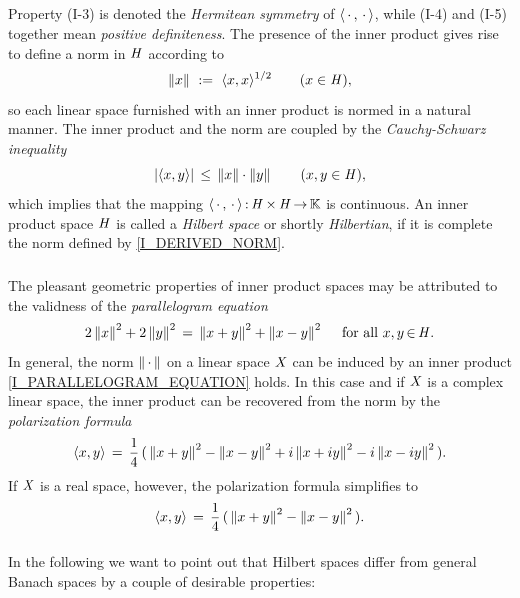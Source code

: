 \documentclass[11pt,twoside]{article}
\begin{document}
\subparagraph{}
Property (I-3) is denoted the \textit{Hermitean symmetry}
of $\langle \,\cdot\,,\,\cdot\, \rangle$,
while (I-4) and (I-5) together mean \textit{positive definiteness}.
The presence of the inner product gives rise to define a norm in $\mathit{H}$
according to
\begin{equation}\label{I_DERIVED_NORM}
\left\lVert x \right\rVert \, \,:=\, \, \langle x,x \rangle ^{1/2} \quad \quad (x \in \mathit{H}),
\end{equation}
so each linear space furnished with an inner product is normed
in a natural manner.
The inner product and the norm are coupled by
the \textit{Cauchy-Schwarz} \textit{inequality}
\[
\abs{\scalar{x}{y}} \, \leq \,
\norm{x} \cdot \norm{y} \quad \quad (x,y \in \hilH),
\]
which implies that the mapping
$\langle \,\cdot\,,\,\cdot\, \rangle{\,:\,}\mathit{H} {\,\times\,} \mathit{H} {\,\to\,} {\mathbb{K}}$ is continuous.
An inner product space $\mathit{H}$ is called a \textit{Hilbert space}
or shortly \textit{Hilbertian},
if it is complete {\wrt} the norm defined by \eqref{I_DERIVED_NORM}.

\subparagraph{} %
The pleasant geometric properties of inner product spaces
may be attributed to the validness of the \textit{parallelogram equation}
\begin{equation}\label{I_PARALLELOGRAM_EQUATION}
2 \left\lVert x \right\rVert^2 + 2 \left\lVert y \right\rVert^2 \,=\, \left\lVert x+y \right\rVert^2 + \left\lVert x-y \right\rVert^2
\quad \mbox{ for all } x,y {\,\in\,} \mathit{H}.
\end{equation}
In general,
the norm $\left\lVert \,\cdot\, \right\rVert$ on a linear space $\mathit{X}$
can be induced by an inner product
\iff \eqref{I_PARALLELOGRAM_EQUATION} holds.
In this case and if $\mathit{X}$ is a complex linear space,
the inner product can be recovered from the norm
by the \textit{polarization formula}
\[
\langle x,y \rangle
\,=\,
\frac{1}{4} \,
(\,
\left\lVert x + y \right\rVert^2 - \left\lVert x-y \right\rVert^2 +i \left\lVert x+iy \right\rVert^2 - i \left\lVert x-iy \right\rVert^2
\,).
\]
If $\mathit{X}$ is a real space,
however,
the polarization formula simplifies to
\[
\langle x,y \rangle \,=\,
\frac{1}{4} \,
(\,
\left\lVert x + y \right\rVert^2 - \left\lVert x-y \right\rVert^2
\,).
\]

\paragraph{} %
In the following we want to point out
that Hilbert spaces differ from general Banach spaces
by a couple of desirable properties:
\end{document}

